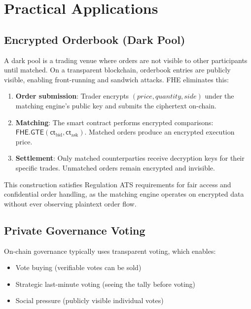 \documentclass[11pt,a4paper]{article}
\begin{document}
\section{Practical Applications}
\label{sec:applications}

\subsection{Encrypted Orderbook (Dark Pool)}

A dark pool is a trading venue where orders are not visible to other participants
until matched. On a transparent blockchain, orderbook entries are publicly visible,
enabling front-running and sandwich attacks. FHE eliminates this:

\begin{enumerate}[leftmargin=2em]
  \item \textbf{Order submission}: Trader encrypts $(price, quantity, side)$ under
        the matching engine's public key and submits the ciphertext on-chain.
  \item \textbf{Matching}: The smart contract performs encrypted comparisons:
        $\textsf{FHE.GTE}(\textsf{ct}_{\text{bid}}, \textsf{ct}_{\text{ask}})$.
        Matched orders produce an encrypted execution price.
  \item \textbf{Settlement}: Only matched counterparties receive decryption keys
        for their specific trades. Unmatched orders remain encrypted and invisible.
\end{enumerate}

This construction satisfies Regulation ATS requirements for fair access and
confidential order handling, as the matching engine operates on encrypted data
without ever observing plaintext order flow.

\subsection{Private Governance Voting}

On-chain governance typically uses transparent voting, which enables:
\begin{itemize}[leftmargin=2em]
  \item Vote buying (verifiable votes can be sold)
  \item Strategic last-minute voting (seeing the tally before voting)
  \item Social pressure (publicly visible individual votes)
\end{itemize}
\end{document}
